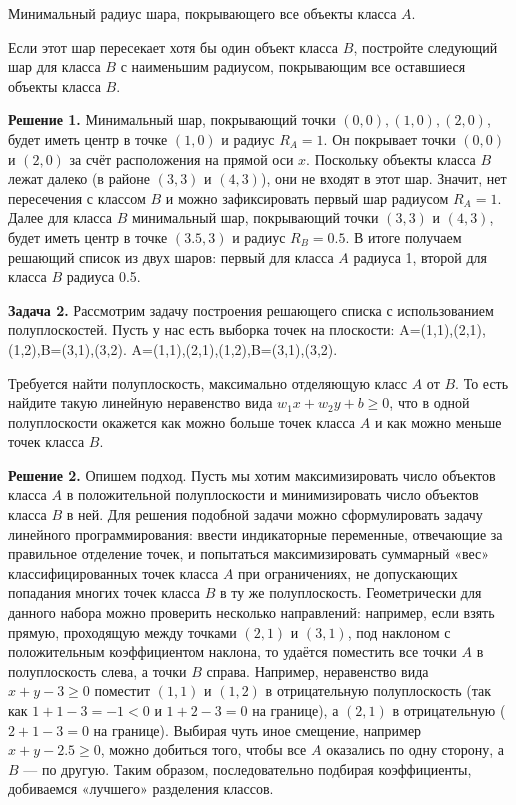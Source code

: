 Минимальный радиус шара, покрывающего все объекты класса $A$.

Если этот шар пересекает хотя бы один объект класса $B$, постройте следующий шар для класса $B$ с наименьшим радиусом, покрывающим все оставшиеся объекты класса $B$.

\textbf{Решение 1.}
Минимальный шар, покрывающий точки $(0,0), (1,0), (2,0)$, будет иметь центр в точке $(1,0)$ и радиус $R_A = 1$. Он покрывает точки $(0,0)$ и $(2,0)$ за счёт расположения на прямой оси $x$. Поскольку объекты класса $B$ лежат далеко (в районе $(3,3)$ и $(4,3)$), они не входят в этот шар. Значит, нет пересечения с классом $B$ и можно зафиксировать первый шар радиусом $R_A = 1$. Далее для класса $B$ минимальный шар, покрывающий точки $(3,3)$ и $(4,3)$, будет иметь центр в точке $(3.5, 3)$ и радиус $R_B = 0.5$. В итоге получаем решающий список из двух шаров: первый для класса $A$ радиуса 1, второй для класса $B$ радиуса 0.5.

\medskip

\textbf{Задача 2.} Рассмотрим задачу построения решающего списка с использованием полуплоскостей. Пусть у нас есть выборка точек на плоскости:
A={(1,1),(2,1),(1,2)},B={(3,1),(3,2)}.
A={(1,1),(2,1),(1,2)},B={(3,1),(3,2)}.

Требуется найти полуплоскость, максимально отделяющую класс $A$ от $B$. То есть найдите такую линейную неравенство вида $w_1 x + w_2 y + b \geq 0$, что в одной полуплоскости окажется как можно больше точек класса $A$ и как можно меньше точек класса $B$.

\textbf{Решение 2.}
Опишем подход. Пусть мы хотим максимизировать число объектов класса $A$ в положительной полуплоскости и минимизировать число объектов класса $B$ в ней. Для решения подобной задачи можно сформулировать задачу линейного программирования: ввести индикаторные переменные, отвечающие за правильное отделение точек, и попытаться максимизировать суммарный «вес» классифицированных точек класса $A$ при ограничениях, не допускающих попадания многих точек класса $B$ в ту же полуплоскость. Геометрически для данного набора можно проверить несколько направлений: например, если взять прямую, проходящую между точками $(2,1)$ и $(3,1)$, под наклоном с положительным коэффициентом наклона, то удаётся поместить все точки $A$ в полуплоскость слева, а точки $B$ справа. Например, неравенство вида $x + y - 3 \geq 0$ поместит $(1,1)$ и $(1,2)$ в отрицательную полуплоскость (так как $1+1-3=-1<0$ и $1+2-3=0$ на границе), а $(2,1)$ в отрицательную ($2+1-3=0$ на границе). Выбирая чуть иное смещение, например $x + y - 2.5 \geq 0$, можно добиться того, чтобы все $A$ оказались по одну сторону, а $B$ — по другую. Таким образом, последовательно подбирая коэффициенты, добиваемся «лучшего» разделения классов.

